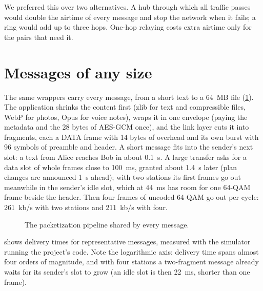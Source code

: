 \documentclass[11pt,a4paper,oneside]{report}
\begin{document}
We preferred this over two alternatives. A hub through which all traffic passes would double the
airtime of every message and stop the network when it fails; a ring would add up to three hops.
One-hop relaying costs extra airtime only for the pairs that need it.

\section{Messages of any size}\label{sec:anysize}
The same wrappers carry every message, from a short text to a \SI{64}{MB} file (\cref{fig:pipeline}).
The application shrinks the content first (zlib for text and compressible files, WebP for photos, Opus
for voice notes), wraps it in one envelope (paying the metadata and the 28 bytes of AES-GCM once),
and the link layer cuts it into fragments, each a DATA frame with 14 bytes of overhead and its own
burst with 96 symbols of preamble and header. A short message fits into the sender's next slot: a text
from Alice reaches Bob in about \SI{0.1}{s}. A large transfer asks for a data slot of whole frames close
to \SI{100}{ms}, granted about \SI{1.4}{s} later (plan changes are announced \SI{1}{s} ahead); with two
stations its first frames go out meanwhile in the sender's idle slot, which at \SI{44}{ms} has room for
one 64-QAM frame beside the header. Then four frames of uncoded 64-QAM go out per cycle:
\SI{261}{kb/s} with two stations and \SI{211}{kb/s} with four.

\begin{figure}[htbp]
\centering
{}
\caption{The packetization pipeline shared by every message.}\label{fig:pipeline}
\end{figure}

 shows delivery times for representative messages, measured with the simulator
running the project's code. Note the logarithmic axis: delivery time spans almost four orders of
magnitude, and with four stations a two-fragment message already waits for its sender's slot to grow
(an idle slot is then \SI{22}{ms}, shorter than one frame).
\end{document}
